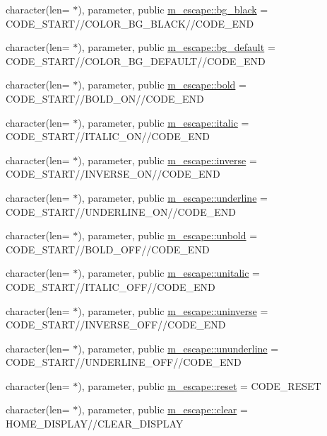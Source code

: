 \begin{DoxyCompactItemize}
\item 
character(len= $\ast$), parameter, public \mbox{\hyperlink{namespacem__escape_a2f34e53ba01ebac10ab70f25e3c9727a}{m\+\_\+escape\+::bg\+\_\+black}} = C\+O\+D\+E\+\_\+\+S\+T\+A\+RT//C\+O\+L\+O\+R\+\_\+\+B\+G\+\_\+\+B\+L\+A\+CK//C\+O\+D\+E\+\_\+\+E\+ND
\item 
character(len= $\ast$), parameter, public \mbox{\hyperlink{namespacem__escape_a329b88dbfe4ad42f896cdf408dcd9784}{m\+\_\+escape\+::bg\+\_\+default}} = C\+O\+D\+E\+\_\+\+S\+T\+A\+RT//C\+O\+L\+O\+R\+\_\+\+B\+G\+\_\+\+D\+E\+F\+A\+U\+LT//C\+O\+D\+E\+\_\+\+E\+ND
\item 
character(len= $\ast$), parameter, public \mbox{\hyperlink{namespacem__escape_a9a369de1d051ce7fdbdedcba4574c962}{m\+\_\+escape\+::bold}} = C\+O\+D\+E\+\_\+\+S\+T\+A\+RT//B\+O\+L\+D\+\_\+\+ON//C\+O\+D\+E\+\_\+\+E\+ND
\item 
character(len= $\ast$), parameter, public \mbox{\hyperlink{namespacem__escape_afbb060c43fe019ca7fc699073cf30399}{m\+\_\+escape\+::italic}} = C\+O\+D\+E\+\_\+\+S\+T\+A\+RT//I\+T\+A\+L\+I\+C\+\_\+\+ON//C\+O\+D\+E\+\_\+\+E\+ND
\item 
character(len= $\ast$), parameter, public \mbox{\hyperlink{namespacem__escape_a568054a95202a9290fc4f314ff7c9012}{m\+\_\+escape\+::inverse}} = C\+O\+D\+E\+\_\+\+S\+T\+A\+RT//I\+N\+V\+E\+R\+S\+E\+\_\+\+ON//C\+O\+D\+E\+\_\+\+E\+ND
\item 
character(len= $\ast$), parameter, public \mbox{\hyperlink{namespacem__escape_acee3a3082a12ed884ef99019d0f30f86}{m\+\_\+escape\+::underline}} = C\+O\+D\+E\+\_\+\+S\+T\+A\+RT//U\+N\+D\+E\+R\+L\+I\+N\+E\+\_\+\+ON//C\+O\+D\+E\+\_\+\+E\+ND
\item 
character(len= $\ast$), parameter, public \mbox{\hyperlink{namespacem__escape_aaa2404c29a0f5840417e71a8219a118c}{m\+\_\+escape\+::unbold}} = C\+O\+D\+E\+\_\+\+S\+T\+A\+RT//B\+O\+L\+D\+\_\+\+O\+FF//C\+O\+D\+E\+\_\+\+E\+ND
\item 
character(len= $\ast$), parameter, public \mbox{\hyperlink{namespacem__escape_a6b95826bb2793069e7fa8f8386bdb520}{m\+\_\+escape\+::unitalic}} = C\+O\+D\+E\+\_\+\+S\+T\+A\+RT//I\+T\+A\+L\+I\+C\+\_\+\+O\+FF//C\+O\+D\+E\+\_\+\+E\+ND
\item 
character(len= $\ast$), parameter, public \mbox{\hyperlink{namespacem__escape_a067207898e3ef5118bc1cad83f40dad8}{m\+\_\+escape\+::uninverse}} = C\+O\+D\+E\+\_\+\+S\+T\+A\+RT//I\+N\+V\+E\+R\+S\+E\+\_\+\+O\+FF//C\+O\+D\+E\+\_\+\+E\+ND
\item 
character(len= $\ast$), parameter, public \mbox{\hyperlink{namespacem__escape_adbaa599772d5df6567d75188ac3258bf}{m\+\_\+escape\+::ununderline}} = C\+O\+D\+E\+\_\+\+S\+T\+A\+RT//U\+N\+D\+E\+R\+L\+I\+N\+E\+\_\+\+O\+FF//C\+O\+D\+E\+\_\+\+E\+ND
\item 
character(len= $\ast$), parameter, public \mbox{\hyperlink{namespacem__escape_ae02be34bb084db8024b234bc87058d3a}{m\+\_\+escape\+::reset}} = C\+O\+D\+E\+\_\+\+R\+E\+S\+ET
\item 
character(len= $\ast$), parameter, public \mbox{\hyperlink{namespacem__escape_a49210f3a0332fb37df08c519b3252bef}{m\+\_\+escape\+::clear}} = H\+O\+M\+E\+\_\+\+D\+I\+S\+P\+L\+AY//C\+L\+E\+A\+R\+\_\+\+D\+I\+S\+P\+L\+AY
\end{DoxyCompactItemize}
